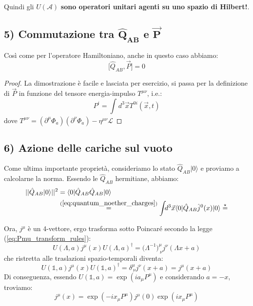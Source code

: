 \documentclass[../main.tex]{subfiles}
\begin{document}
Quindi gli $U(\mathscr{A})$ \textbf{sono operatori unitari agenti su uno spazio di Hilbert!}.

\subsection[Commutazione $\hat{{Q}}_{\mathbf{AB}}$ - $\Vec{{P}}$]{5) Commutazione tra $\hat{\mathbf{Q}}_{\mathbf{AB}}$ e $\Vec{\mathbf{P}}$}

Così come per l'operatore Hamiltoniano, anche in questo caso abbiamo:
\begin{equation}
    \boxed{\big[ \hat{Q}_{AB}, \Vec{P}\big] = 0}
    \label{eq:Q_P_commrels}
\end{equation}
\begin{proof}
    La dimostrazione è facile e lasciata per esercizio, si passa per la definizione di $\Vec{P}$ in funzione del tensore energia-impulso $T^{\mu\nu}$, i.e.:
    \[
    P^i = \int_{}d^3\Vec{x} T^{0i}(\Vec{x}, t)
    \]
    dove \(T^{\mu\nu} = (\partial^\mu\Phi_a)(\partial^\nu\Phi_a) - \eta^{\mu\nu}\mathscr L\)
\end{proof}

\subsection[Azione delle $\hat{Q}_{AB}$ sul vuoto]{6) Azione delle cariche sul vuoto}
Come ultima importante proprietà, consideriamo lo stato $\hat{Q}_{AB}|0\rangle$ e proviamo a calcolarne la norma. Essendo le $\hat{Q}_{AB}$ hermitiane, abbiamo:
\begin{align*}
    ||\hat{Q}_{AB}|0\rangle||^2 &= \langle 0 |\hat{Q}_{AB}\hat{Q}_{AB}| 0\rangle\\
    &\overset{(\ref{eq:quantum_noether_charges})}{=}\int_{}d^3\Vec{x}\langle 0 |\hat{Q}_{AB}\hat{j}^0(x)| 0\rangle \overset{\star}{=}
\end{align*}

Ora, $j^\mu$ è un 4-vettore, ergo trasforma sotto Poincaré secondo la legge (\ref{eq:Pmu_transform_rules}):
\[
U(\Lambda, a) j^\mu(x)U(\Lambda, a)^\dagger = \big(\Lambda^{-1}\big)^\mu_{~\nu}j^\nu(\Lambda x+a)
\]
che ristretta alle traslazioni spazio-temporali diventa:
\[
U(\mathbb 1, a) j^\mu(x)U(\mathbb 1, a)^\dagger = \delta^\mu_{~\nu}j^\nu(x+a) = j^\mu(x+a)
\]
Di conseguenza, essendo $U(\mathbb 1, a) = \exp(ia_\mu P^\mu)$ e considerando $a=-x$, troviamo:
\[
j^\mu(x) = \exp(-ix_\mu P^\mu)j^\mu(0)\exp(ix_\mu P^\mu)
\]
\end{document}
